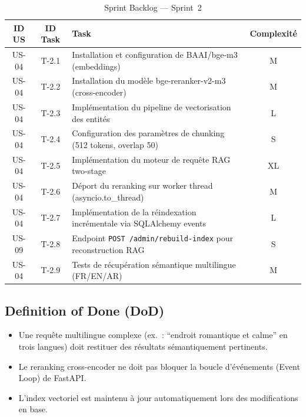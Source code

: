 \begin{table}[H]
    \centering
    \caption{Sprint Backlog --- Sprint~2}
    \label{tab:sprint2_backlog}
    \small
    \begin{tabular}{c c p{7cm} c}
        \toprule
        \textbf{ID US} & \textbf{ID Task} & \textbf{Task} & \textbf{Complexité} \\
        \midrule
        US-04 & T-2.1 & Installation et configuration de BAAI/bge-m3 (embeddings) & M \\[3pt]
        US-04 & T-2.2 & Installation du modèle bge-reranker-v2-m3 (cross-encoder) & M \\[3pt]
        US-04 & T-2.3 & Implémentation du pipeline de vectorisation des entités & L \\[3pt]
        US-04 & T-2.4 & Configuration des paramètres de chunking (512 tokens, overlap 50) & S \\[3pt]
        US-04 & T-2.5 & Implémentation du moteur de requête RAG two-stage & XL \\[3pt]
        US-04 & T-2.6 & Déport du reranking sur worker thread (asyncio.to\_thread) & M \\[3pt]
        US-04 & T-2.7 & Implémentation de la réindexation incrémentale via SQLAlchemy events & L \\[3pt]
        US-09 & T-2.8 & Endpoint \texttt{POST /admin/rebuild-index} pour reconstruction RAG & S \\[3pt]
        US-04 & T-2.9 & Tests de récupération sémantique multilingue (FR/EN/AR) & M \\
        \bottomrule
    \end{tabular}
\end{table}

\subsection{Definition of Done (DoD)}

\begin{itemize}
    \item Une requête multilingue complexe (ex.\ : \enquote{endroit romantique et calme} en
    trois langues) doit restituer des résultats sémantiquement pertinents.
    \item Le reranking cross-encoder ne doit pas bloquer la boucle d'événements (Event Loop)
    de FastAPI.
    \item L'index vectoriel est maintenu à jour automatiquement lors des modifications en base.
\end{itemize}


